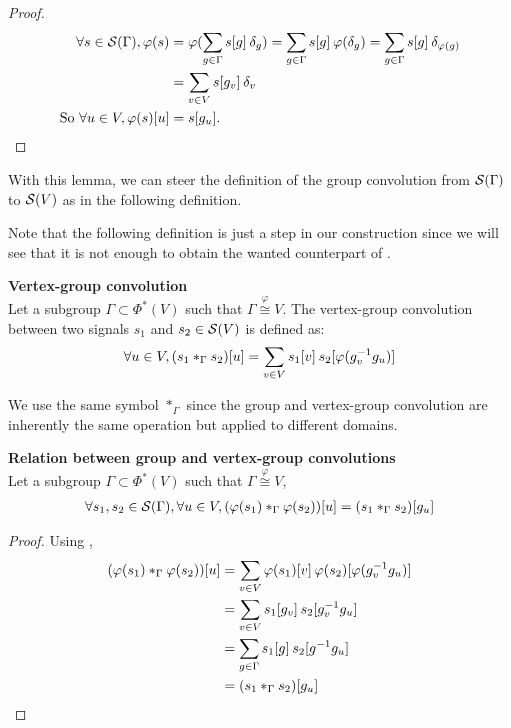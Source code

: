 \begin{proof}
\begin{align*}
\forall s \in \cs(\Gamma), \varphi(s) & = \varphi(\displaystyle \sum_{g \in \Gamma} s[g] \h{2} \delta_g)
 = \displaystyle \sum_{g \in \Gamma} s[g] \h{2} \varphi(\delta_g)
 = \displaystyle \sum_{g \in \Gamma} s[g] \h{2} \delta_{\varphi(g)}\\
 & = \displaystyle \sum_{v \in V} s[g_v] \h{2} \delta_v\\
 \text{So }\forall u \in V, \varphi(s) [u] & = s[g_u].
\end{align*}
\end{proof}

With this lemma, we can steer the definition of the group convolution from $\cs(\Gamma)$ to $\cs(V)$ as in the following definition.

\begin{remark}
Note that the following definition is just a step in our construction since we will see that it is not enough to obtain the wanted counterpart of .
\end{remark}

\begin{definition}\textbf{Vertex-group convolution}\\
Let a subgroup $\Gamma \subset \Phi^*(V)$ such that $\Gamma \overset{\varphi}{\cong} V$.
The vertex-group convolution between two signals $s_1$ and $s_2 \in \cs(V)$ is defined as:
\begin{gather*}
\forall u \in V, (s_1 \ast_{\Gamma} s_2) [u] = \displaystyle \sum_{v \in V} s_1[v] \h{2} s_2[\varphi(g_v^{-1}g_u)]
\end{gather*}
\label{def:conv2}
\end{definition}

We use the same symbol $\ast_\Gamma$ since the group and vertex-group convolution are inherently the same operation but applied to different domains.

\begin{lemma}\textbf{Relation between group and vertex-group convolutions}\\
Let a subgroup $\Gamma \subset \Phi^*(V)$ such that $\Gamma \overset{\varphi}{\cong} V$,
\begin{gather*}
\forall s_1, s_2 \in \cs(\Gamma), \forall u \in V,
(\varphi(s_1) \ast_{\Gamma} \varphi(s_2))[u] = (s_1 \ast_{\Gamma} s_2)[g_u]
\end{gather*}
\label{lem:rel12}
\end{lemma}
\begin{proof}
Using ,
\begin{align*}
(\varphi(s_1) \ast_{\Gamma} \varphi(s_2))[u] & = \displaystyle \sum_{v \in V} \varphi(s_1)[v] \h{2} \varphi(s_2)[\varphi(g_v^{-1}g_u)]\\
 & = \displaystyle \sum_{v \in V} s_1[g_v] \h{2} s_2[g_v^{-1}g_u]\\
 & = \displaystyle \sum_{g \in \Gamma} s_1[g] \h{2} s_2[g^{-1}g_u]\\
 & = (s_1 \ast_{\Gamma} s_2)[g_u]
\end{align*}
\end{proof}

